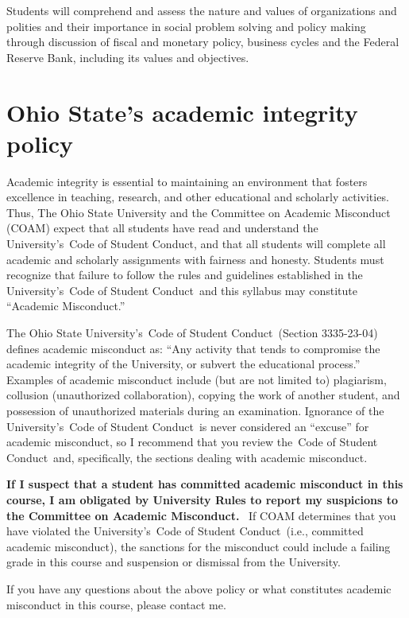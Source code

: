 \documentclass[12pt]{article}
\begin{document}
Students will comprehend and assess the nature and values of organizations and polities and their importance in social problem solving and policy making through discussion of fiscal and monetary policy, business cycles and the Federal Reserve Bank, including its values and objectives.



\newpage

\section*{Ohio State’s academic integrity policy}

Academic integrity is essential to maintaining an environment that fosters excellence in teaching, research, and other educational and scholarly activities.
Thus, The Ohio State University and the Committee on Academic Misconduct (COAM) expect that all students have read and understand the University’s Code of Student Conduct, and that all students will complete all academic and scholarly assignments with fairness and honesty.
Students must recognize that failure to follow the rules and guidelines established in the University’s Code of Student Conduct and this syllabus may constitute ``Academic Misconduct.''

The Ohio State University’s Code of Student Conduct (Section 3335-23-04) defines academic misconduct as: ``Any activity that tends to compromise the academic integrity of the University, or subvert the educational process.''
Examples of academic misconduct include (but are not limited to) plagiarism, collusion (unauthorized collaboration), copying the work of another student, and possession of unauthorized materials during an examination.
Ignorance of the University’s Code of Student Conduct is never considered an ``excuse'' for academic misconduct, so I recommend that you review the Code of Student Conduct and, specifically, the sections dealing with academic misconduct.

\textbf{If I suspect that a student has committed academic misconduct in this course, I am obligated by University Rules to report my suspicions to the Committee on Academic Misconduct.} 
If COAM determines that you have violated the University’s Code of Student Conduct (i.e., committed academic misconduct), the sanctions for the misconduct could include a failing grade in this course and suspension or dismissal from the University.

If you have any questions about the above policy or what constitutes academic misconduct in this course, please contact me.
\end{document}
